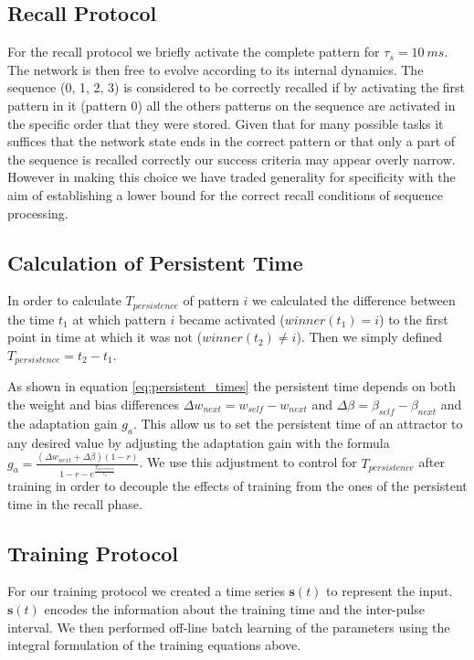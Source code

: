 \documentclass[10pt,a4paper]{article}
\begin{document}
\subsection{Recall Protocol}
For the recall protocol we briefly activate the complete pattern for $\tau_s = 10 \: ms$. The network is then free to evolve according to its internal dynamics. The sequence (0, 1, 2, 3) is considered to be correctly recalled if by activating the first pattern in it (pattern 0) all the others patterns on the sequence are activated in the specific order that they were stored. Given that for many possible tasks it suffices that the network state ends in the correct pattern or that only a part of the sequence is recalled correctly our success criteria may appear overly narrow. However in making this choice we have traded generality for specificity with the aim of establishing a lower bound for the correct recall conditions of sequence processing.


\subsection{Calculation of Persistent Time}
In order to calculate $T_{persistence}$ of pattern $i$ we calculated the difference between the time $t_1$ at which pattern $i$ became activated ($winner(t_1) = i$) to the first point in time at which it was not ($winner(t_2) \neq i$). Then we simply defined $T_{persistence} = t_2 - t_1$.

As shown in equation \ref{eq:persistent_times} the persistent time depends on both the weight and bias differences $\Delta w_{next} = w_{self} - w_{next}$ and $\Delta \beta = \beta_{self} - \beta_{next}$ and the adaptation gain $g_a$. This allow us to  set the persistent time of an attractor to any desired value by adjusting the adaptation gain with the formula $g_a = \frac{(\Delta w_{next} + \Delta \beta)(1 - r)}{1 - r - e^{\frac{T_{persistence}}{\tau_a}}}$. We use this adjustment to control for $T_{persistence}$ after training in order to decouple the effects of training from the ones of the persistent time in the recall phase. 

\subsection{Training Protocol}
For our training protocol we created a time series  $\mathbf{s}(t)$ to represent the input. $\mathbf{s}(t)$  encodes the information about the training time and the inter-pulse interval. We then performed off-line batch learning of the parameters using the integral formulation of the training equations above.
\end{document}
